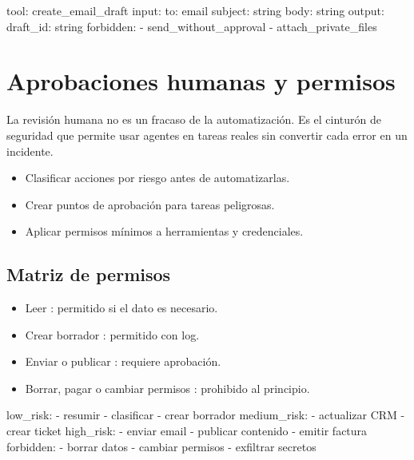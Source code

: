 \documentclass[11pt,a4paper]{book}
\begin{document}
\begin{codebox}
tool: create_email_draft
input:
  to: email
  subject: string
  body: string
output:
  draft_id: string
forbidden:
  - send_without_approval
  - attach_private_files
\end{codebox}
\chapter{Aprobaciones humanas y permisos}
La revisión humana no es un fracaso de la automatización. Es el cinturón de seguridad que permite usar agentes en tareas reales sin convertir cada error en un incidente.

\begin{itemize}\item Clasificar acciones por riesgo antes de automatizarlas.\end{itemize}
\begin{itemize}\item Crear puntos de aprobación para tareas peligrosas.\end{itemize}
\begin{itemize}\item Aplicar permisos mínimos a herramientas y credenciales.\end{itemize}
\section{Matriz de permisos}
\begin{itemize}\item Leer : permitido si el dato es necesario.\end{itemize}
\begin{itemize}\item Crear borrador : permitido con log.\end{itemize}
\begin{itemize}\item Enviar o publicar : requiere aprobación.\end{itemize}
\begin{itemize}\item Borrar, pagar o cambiar permisos : prohibido al principio.\end{itemize}
\begin{codebox}
low_risk:
  - resumir
  - clasificar
  - crear borrador
medium_risk:
  - actualizar CRM
  - crear ticket
high_risk:
  - enviar email
  - publicar contenido
  - emitir factura
forbidden:
  - borrar datos
  - cambiar permisos
  - exfiltrar secretos
\end{codebox}
\end{document}
